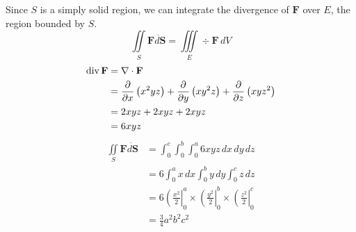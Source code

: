 \documentclass[12pt]{article}
\begin{document}
Since $S$ is a simply solid region, we can integrate the divergence of $\mathbf{F}$ over $E$, the region bounded by $S$.
%
\begin{equation*}
\iint\limits_S{\mathbf{F}\dot{d\mathbf{S}}}=\iiint\limits_E\div{\mathbf{F}}\,dV
\end{equation*}
\begin{align*}
\div{\mathbf{F}}&=\nabla\dot\mathbf{F}\\
&=\partial{}{x}\paren{x^2yz}+\partial{}{y}\paren{xy^2z}+\partial{}{z}\paren{xyz^2}\\
&=2xyz+2xyz+2xyz\\
&=6xyz
\end{align*}
\begin{align*}
\iint\limits_S{\mathbf{F}\dot{d\mathbf{S}}}&=\int_{0}^{c}\int_{0}^{b}\int_{0}^{a}{6xyz}{\,dx\,dy\,dz}\\
&=6\int_{0}^{a}{x\,dx}\int_{0}^{b}{y\,dy}\int_{0}^{c}{z\,dz}\\
&=6\left(\frac{x^2}{2}\right|_{0}^{a}\times\left(\frac{y^2}{2}\right|_{0}^{b}\times\left(\frac{z^2}{2}\right|_{0}^{c}\\
&=\frac{3}{4}a^2b^2c^2
\end{align*}
\end{document}
